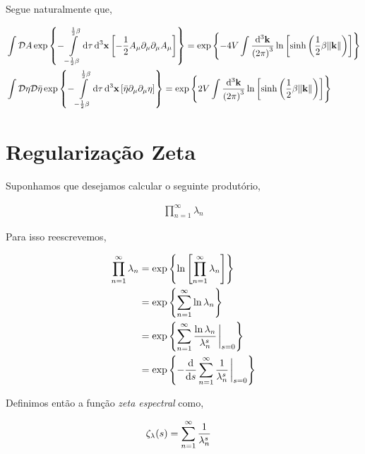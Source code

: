 \documentclass[twoside]{amsart}
\newcommand{\Dd}[1]{\mathcal D #1}
\numberwithin{equation}{section}
\begin{document}
Segue naturalmente que,

\begin{align}
    &\int\Dd{A}\exp\qty{-\int\limits_{-\frac12\beta}^{\frac12\beta}\dd{\tau}\dd[3]{\vb x}\qty[-\frac12A_{\mu}\partial_\mu\partial_\mu A_\mu]}=\exp\qty{-4V\int\frac{\dd[3]{\vb k}}{\qty(2\pi)^3}\ln\qty[\sinh\qty(\frac12\beta\norm{\vb k})]}\\
    &\int\Dd{\eta}\Dd{\bar\eta}\exp\qty{-\int\limits_{-\frac12\beta}^{\frac12\beta}\dd{\tau}\dd[3]{\vb x}\qty[\bar\eta\partial_\mu \partial_\mu \eta]}=\exp\qty{2V\int\frac{\dd[3]{\vb k}}{\qty(2\pi)^3}\ln\qty[\sinh\qty(\frac12\beta\norm{\vb k})]}
\end{align}


\appendix

\section{Regularização Zeta}

Suponhamos que desejamos calcular o seguinte produtório,

\begin{align}
    \prod\limits_{n=1}^{\infty}\lambda_n
\end{align}

Para isso reescrevemos,

\begin{align}
    \prod\limits_{n=1}^{\infty}\lambda_n&=\exp\qty{\ln\qty[\prod\limits_{n=1}^{\infty}\lambda_n]}\\
    &=\exp\qty{\sum\limits_{n=1}^{\infty}\ln\lambda_n}\\
    &=\exp\qty{\sum\limits_{n=1}^{\infty}\frac{\ln\lambda_n}{\lambda_n^s}\eval_{s=0}}\\
    &=\exp\qty{-\dv{}{s}\sum\limits_{n=1}^{\infty}\frac{1}{\lambda_n^s}\eval_{s=0}}
\end{align}

Definimos então a função \emph{zeta espectral} como,

\begin{align}
    \zeta_\lambda\qty(s)&=\sum\limits_{n=1}^{\infty}\frac{1}{\lambda_n^s}
\end{align}
\end{document}
